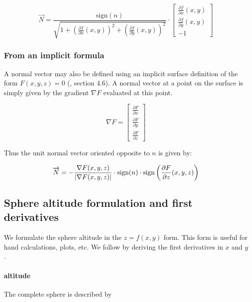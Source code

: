\begin{equation} \label{eq:gen-normal}
\overrightarrow{N} =
\frac{\textrm{sign}(n)}
     {\sqrt{1 + \left(\frac{\partial f}{\partial x}(x, y)\right)^2 +
                \left(\frac{\partial f}{\partial y}(x, y)\right)^2}}
\cdot
\begin{bmatrix}
\frac{\partial f}{\partial x}(x, y) \\
\frac{\partial f}{\partial y}(x, y) \\
-1
\end{bmatrix}
\end{equation}

\subsubsection{From an implicit formula}
A normal vector may also be defined using an implicit surface definition of
the form $F(x, y, z) = 0$ (\cite{wiki:normal}, \cite{Welford:1986} section 4.6).
A normal vector at a point on the surface is simply given by the gradient
$\nabla F$ evaluated at this point.

\begin{equation}
\nabla F =
\begin{bmatrix}
\frac{\partial F}{\partial x} \\
\frac{\partial F}{\partial y} \\
\frac{\partial F}{\partial z}
\end{bmatrix}
\end{equation}

Thus the unit normal vector oriented opposite to $n$ is given by:

\begin{equation}
\overrightarrow{N} = - \frac{\nabla F (x, y, z)}
                          {\abs{\nabla F(x, y, z)}} \cdot
  \textrm{sign}(n) \cdot
  \textrm{sign}\left(\frac{\partial F}{\partial z}(x, y, z)\right)
\end{equation}

\subsection{Sphere altitude formulation and first derivatives}
We formulate the sphere altitude in the $z = f(x, y)$ form. This form
is useful for hand calculations, plots, etc. We follow by deriving the
first derivatives in $x$ and $y$.

\paragraph{altitude}
The complete sphere is described by

